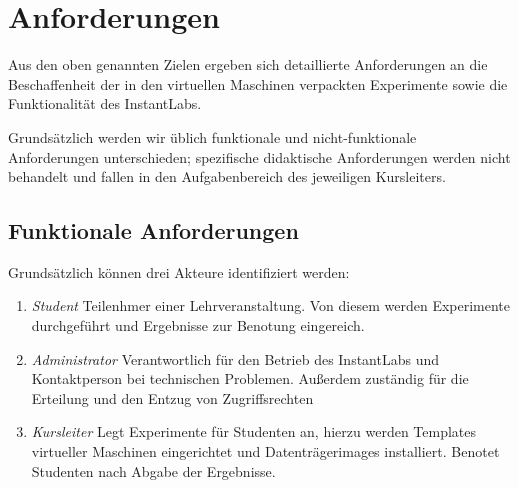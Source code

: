 \section{Anforderungen}
\label{sec:requirements}

		Aus den oben genannten Zielen ergeben sich detaillierte Anforderungen an die Beschaffenheit der in den virtuellen Maschinen verpackten Experimente sowie die Funktionalität des InstantLabs.

		Grundsätzlich werden wir üblich funktionale und nicht-funktionale Anforderungen unterschieden;
		spezifische didaktische Anforderungen werden nicht behandelt und fallen in den Aufgabenbereich des jeweiligen Kursleiters. 

		\subsection{Funktionale Anforderungen}


		Grundsätzlich können drei Akteure identifiziert werden:

		\begin{enumerate}
			\item \emph{Student} Teilenhmer einer Lehrveranstaltung. Von diesem werden Experimente durchgeführt und Ergebnisse zur Benotung eingereich.
			\item \emph{Administrator} Verantwortlich für den Betrieb des InstantLabs und Kontaktperson bei technischen Problemen. Außerdem zuständig für die Erteilung und den Entzug von Zugriffsrechten
			\item \emph{Kursleiter} Legt Experimente für Studenten an, hierzu werden Templates virtueller Maschinen eingerichtet und Datenträgerimages installiert. Benotet Studenten nach Abgabe der Ergebnisse.
		\end{enumerate}


